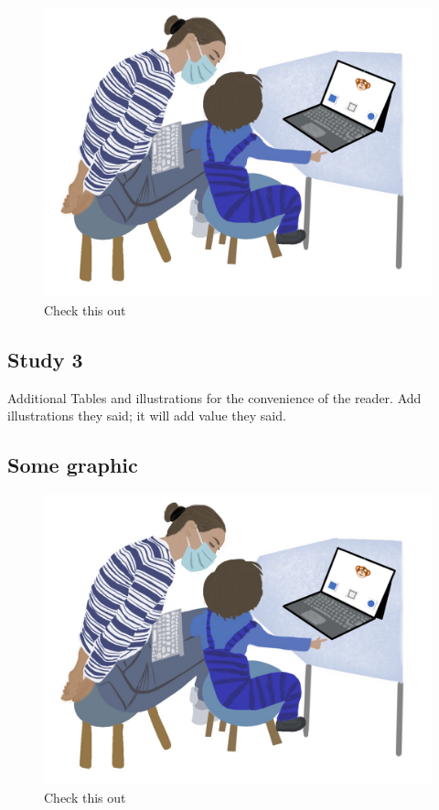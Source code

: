\documentclass[
  man]{apa6}
\begin{document}
\begin{figure}

{\centering \includegraphics{../illustrations/Symlit_Rep_Setup_fromarrows} 

}

\caption{Check this out}\label{fig:suppl-setup4}
\end{figure}

\subsection{Study 3}\label{study-3-1}

Additional Tables and illustrations for the convenience of the reader. Add illustrations they said; it will add value they said.

\subsection{Some graphic}\label{some-graphic-2}

\begin{figure}

{\centering \includegraphics{../illustrations/Symlit_Rep_Setup_fromarrows} 

}

\caption{Check this out}\label{fig:suppl-setup5}
\end{figure}
\end{document}
